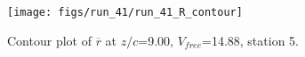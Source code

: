 \begin{figure}[H]
\centering
\texttt{[image: figs/run\_41/run\_41\_R\_contour]}
\caption{Contour plot of $\overline{r}$ at $z/c$=9.00, $V_{free}$=14.88, station 5.}
\label{fig:run_41_R_contour}
\end{figure}


